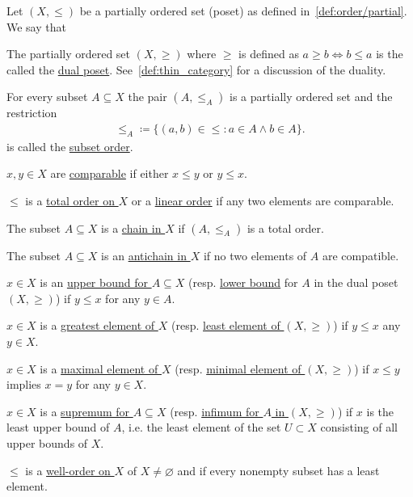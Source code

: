 \begin{definition}\label{def:poset}\cite[10]{Lectures:general_topology}
  Let $(X, \leq)$ be a partially ordered set (poset) as defined in~\cref{def:order/partial}. We say that
  \begin{defenum}
    \item\label{def:poset/dual} The partially ordered set $(X, \geq)$ where $\geq$ is defined as $a \geq b \iff b \leq a$ is the called the \uline{dual poset}. See~\cref{def:thin_category} for a discussion of the duality.

    \item\label{def:poset/subset_order} For every subset $A \subseteq X$ the pair $(A, \leq_A)$ is a partially ordered set and the restriction
    \begin{align*}
      \leq_A \coloneqq \{ (a, b) \in \leq \colon a \in A \land b \in A \}.
    \end{align*}
    is called the \uline{subset order}.

    \item\label{def:poset/comparable_elements} $x, y \in X$ are \uline{comparable} if either $x \leq y$ or $y \leq x$.
    \item\label{def:poset/total_order} $\leq$ is a \uline{total order on $X$} or a \uline{linear order} if any two elements are comparable.
    \item\label{def:poset/chain} The subset $A \subseteq X$ is a \uline{chain in $X$} if $(A, \leq_A)$ is a total order.
    \item\label{def:poset/antichain} The subset $A \subseteq X$ is an \uline{antichain in $X$} if no two elements of $A$ are compatible.
    \item\label{def:poset/upper_lower_bound} $x \in X$ is an \uline{upper bound for $A \subseteq X$} (resp. \uline{lower bound} for $A$ in the dual poset $(X, \geq)$) if $y \leq x$ for any $y \in A$.
    \item\label{def:poset/greatest_least_element} $x \in X$ is a \uline{greatest element of $X$} (resp. \uline{least element of $(X, \geq)$}) if $y \leq x$ any $y \in X$.
    \item\label{def:poset/maximal_minimal_element} $x \in X$ is a \uline{maximal element of $X$} (resp. \uline{minimal element of $(X, \geq)$}) if $x \leq y$ implies $x = y$ for any $y \in X$.
    \item\label{def:poset/supremum_infimum} $x \in X$ is a \uline{supremum for $A \subseteq X$} (resp. \uline{infimum for $A$ in $(X, \geq)$}) if $x$ is the least upper bound of $A$, i.e. the least element of the set $U \subset X$ consisting of all upper bounds of $X$.
    \item\label{def:poset/well_order} $\leq$ is a \uline{well-order on $X$} of $X \neq \varnothing$ and if every nonempty subset has a least element.
  \end{defenum}
\end{definition}

